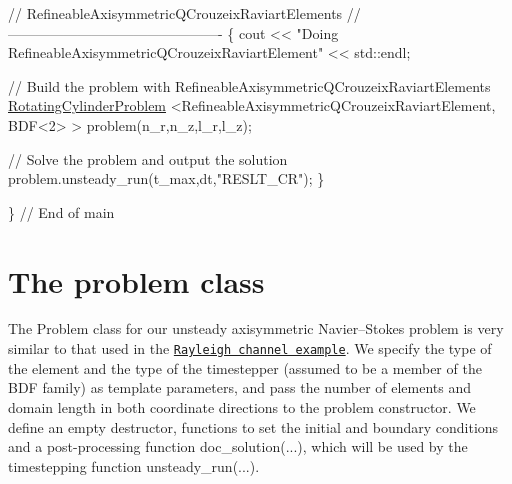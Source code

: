 \begin{DoxyCodeInclude}
 \textcolor{comment}{// RefineableAxisymmetricQCrouzeixRaviartElements}
 \textcolor{comment}{// ----------------------------------------------}
 \{
  cout << \textcolor{stringliteral}{"Doing RefineableAxisymmetricQCrouzeixRaviartElement"} << std::endl;

  \textcolor{comment}{// Build the problem with RefineableAxisymmetricQCrouzeixRaviartElements}
  \hyperlink{classRotatingCylinderProblem}{RotatingCylinderProblem}
   <RefineableAxisymmetricQCrouzeixRaviartElement, BDF<2> >
   problem(n\_r,n\_z,l\_r,l\_z);

  \textcolor{comment}{// Solve the problem and output the solution}
  problem.unsteady\_run(t\_max,dt,\textcolor{stringliteral}{"RESLT\_CR"});
 \}
 
\} \textcolor{comment}{// End of main}

\end{DoxyCodeInclude}




 

\hypertarget{index_problem}{}\section{The problem class}\label{index_problem}
The {\ttfamily Problem} class for our unsteady axisymmetric Navier--Stokes problem is very similar to that used in the \href{../../../navier_stokes/rayleigh_channel/html/index.html}{\tt Rayleigh channel example}. We specify the type of the element and the type of the timestepper (assumed to be a member of the {\ttfamily B\+DF} family) as template parameters, and pass the number of elements and domain length in both coordinate directions to the problem constructor. We define an empty destructor, functions to set the initial and boundary conditions and a post-\/processing function {\ttfamily doc\+\_\+solution}(...), which will be used by the timestepping function {\ttfamily unsteady\+\_\+run}(...).

